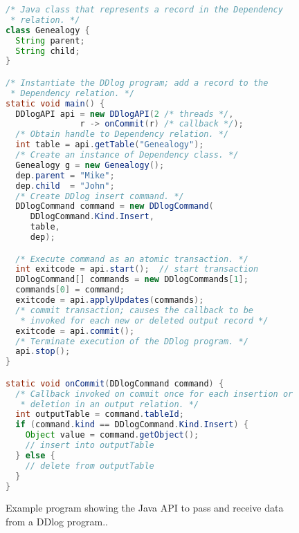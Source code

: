\begin{figure}
    \footnotesize
    \begin{lstlisting}[language=Java]
/* Java class that represents a record in the Dependency
 * relation. */
class Genealogy {
  String parent;
  String child;
}

/* Instantiate the DDlog program; add a record to the
 * Dependency relation. */
static void main() {
  DDlogAPI api = new DDlogAPI(2 /* threads */,
               r -> onCommit(r) /* callback */);
  /* Obtain handle to Dependency relation. */
  int table = api.getTable("Genealogy");
  /* Create an instance of Dependency class. */
  Genealogy g = new Genealogy();
  dep.parent = "Mike";
  dep.child  = "John";
  /* Create DDlog insert command. */
  DDlogCommand command = new DDlogCommand(
     DDlogCommand.Kind.Insert,
     table,
     dep);

  /* Execute command as an atomic transaction. */
  int exitcode = api.start();  // start transaction
  DDlogCommand[] commands = new DDlogCommands[1];
  commands[0] = command;
  exitcode = api.applyUpdates(commands);
  /* commit transaction; causes the callback to be 
   * invoked for each new or deleted output record */
  exitcode = api.commit();
  /* Terminate execution of the DDlog program. */
  api.stop();
}

static void onCommit(DDlogCommand command) {
  /* Callback invoked on commit once for each insertion or
   * deletion in an output relation. */
  int outputTable = command.tableId;
  if (command.kind == DDlogCommand.Kind.Insert) {
    Object value = command.getObject();
    // insert into outputTable
  } else {
    // delete from outputTable
  }
}
\end{lstlisting}
\caption{Example program showing the Java API to pass and receive data
  from a DDlog program.\label{fig:javaapi}.}
\end{figure}

